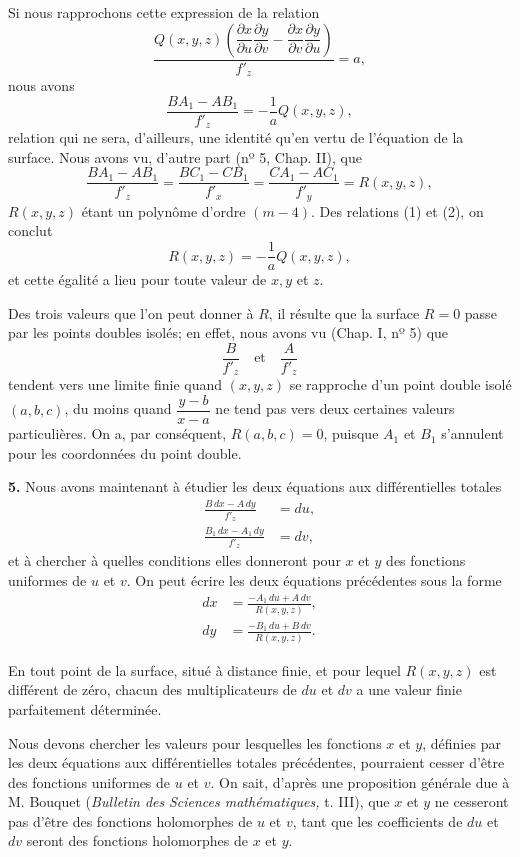 \documentclass{article}
\begin{document}
Si nous rapprochons cette expression de la relation
\[
\frac{Q(x, y, z)\left(\dfrac{\partial x}{\partial u} \dfrac{\partial y}{\partial v} - \dfrac{\partial x}{\partial v} \dfrac{\partial y}{\partial u}\right)}{f'_{z}} = a,
\]
nous avons
\[
\frac{BA_{1} - AB_{1}}{f'_{z}} = -\frac{1}{a} Q(x, y, z),
\tag{1}
\]
relation qui ne sera, d'ailleurs, une identité qu'en vertu de l'équation de la surface. Nous avons vu, d'autre part (nº 5, Chap. II), que
\[
\frac{BA_{1} - AB_{1}}{f'_{z}} = \frac{BC_{1} - CB_{1}}{f'_{x}} = \frac{CA_{1} - AC_{1}}{f'_{y}} = R(x, y, z),
\tag{2}
\]
$R(x, y, z)$ étant un polynôme d'ordre $(m - 4)$. Des relations (1) et (2),
on conclut
\[
R(x, y, z) = -\frac{1}{a} Q(x, y, z),
\]
et cette égalité a lieu pour toute valeur de $x, y$ et $z$.

Des trois valeurs que l'on peut donner à $R$, il résulte que la surface $R = 0$ passe par les points doubles isolés; en effet, nous avons vu (Chap. I, nº 5) que
\[
\frac{B}{f'_{z}} \quad \text{et} \quad \frac{A}{f'_{z}}
\]
tendent vers une limite finie quand $(x, y, z)$ se rapproche d'un point double isolé $(a, b, c)$, du moins quand $\dfrac{y - b}{x - a}$ ne tend pas vers deux certaines valeurs particulières. On a, par conséquent, $R(a, b, c) = 0$, puisque $A_{1}$ et $B_{1}$ s'annulent pour les coordonnées du point double.

\textbf{5.} Nous avons maintenant à étudier les deux équations aux différentielles totales
\[
\begin{aligned}
\frac{B\,dx - A\,dy}{f'_{z}} &= du, \\
\frac{B_{1}\,dx - A_{1}\,dy}{f'_{z}} &= dv,
\end{aligned}
\]
et à chercher à quelles conditions elles donneront pour $x$ et $y$ des fonctions uniformes de $u$ et $v$. On peut écrire les deux équations précédentes sous la forme
\[
\begin{aligned}
dx &= \frac{-A_{1}\,du + A\,dv}{R(x, y, z)}, \\
dy &= \frac{-B_{1}\,du + B\,dv}{R(x, y, z)}.
\end{aligned}
\]

En tout point de la surface, situé à distance finie, et pour lequel $R(x, y, z)$ est différent de zéro, chacun des multiplicateurs de $du$ et $dv$ a une valeur finie parfaitement déterminée.

Nous devons chercher les valeurs pour lesquelles les fonctions $x$ et $y$, définies par les deux équations aux différentielles totales précédentes, pourraient cesser d'être des fonctions uniformes de $u$ et $v$. On sait, d'après une proposition générale due à M. Bouquet (\emph{Bulletin des}
\emph{Sciences mathématiques,} t. III), que $x$ et $y$ ne cesseront pas d'être des fonctions holomorphes de $u$ et $v$, tant que les coefficients de $du$ et $dv$ seront des fonctions holomorphes de $x$ et $y$.
\end{document}
